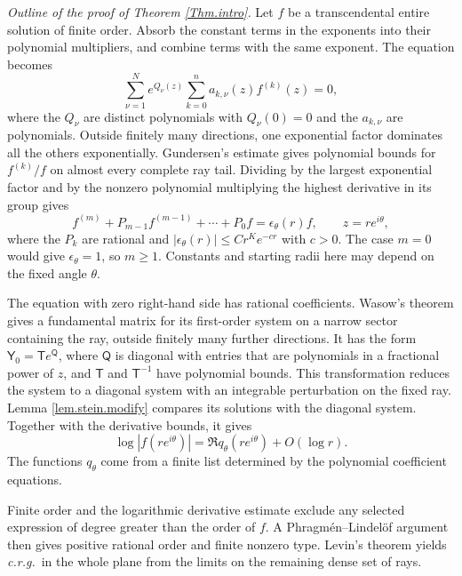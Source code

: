 \documentclass[a4paper,12pt]{article}
\numberwithin{equation}{section}
\begin{document}
\bigskip
\noindent\textit{Outline of the proof of Theorem \ref{Thm.intro}.}
Let $f$ be a transcendental entire solution of finite order.
Absorb the constant terms in the exponents into their polynomial
multipliers, and combine terms with the same exponent. The equation becomes
\[
 \sum_{\nu=1}^{N}e^{Q_\nu(z)}
       \sum_{k=0}^{n}a_{k,\nu}(z)f^{(k)}(z)=0,
\]
where the $Q_\nu$ are distinct polynomials with $Q_\nu(0)=0$ and the
$a_{k,\nu}$ are polynomials.
Outside finitely many directions, one exponential factor dominates all the others exponentially.
Gundersen's estimate gives polynomial bounds for $f^{(k)}/f$ on
almost every complete ray tail.
Dividing by the largest exponential factor and by the nonzero polynomial
multiplying the highest derivative in its group gives
\[
 f^{(m)}+P_{m-1}f^{(m-1)}+\cdots+P_0f
 =\epsilon_\theta(r)f,\qquad z=re^{i\theta},
\]
where the $P_k$ are rational and
$|\epsilon_\theta(r)|\le Cr^K e^{-cr}$ with $c>0$.
The case $m=0$ would give $\epsilon_\theta=1$, so $m\ge1$.
Constants and starting radii here may depend on the fixed angle $\theta$.

The equation with zero right-hand side has rational coefficients.
Wasow's theorem gives a fundamental matrix for its first-order system
on a narrow sector containing the ray, outside finitely many further
directions. It has the form
$\mathsf Y_0=\mathsf T e^{\mathsf Q}$, where $\mathsf Q$ is diagonal
with entries that are polynomials in a fractional power of $z$, and
$\mathsf T$ and $\mathsf T^{-1}$ have polynomial bounds.
This transformation reduces the system to a diagonal system with an integrable perturbation on the fixed ray.
Lemma \ref{lem.stein.modify} compares its solutions with the diagonal
system. Together with the derivative bounds, it gives
\[
 \log|f(re^{i\theta})|=\Re q_\theta(re^{i\theta})+O(\log r).
\]
The functions $q_\theta$ come from a finite list determined by the
polynomial coefficient equations.

Finite order and the logarithmic derivative estimate exclude any
selected expression of degree greater than the order of $f$.
A Phragm\'en--Lindel\"of argument then gives positive rational order
and finite nonzero type.
Levin's theorem yields \textit{c.r.g.}\ in the whole plane
from the limits on the remaining dense set of rays.
\end{document}
